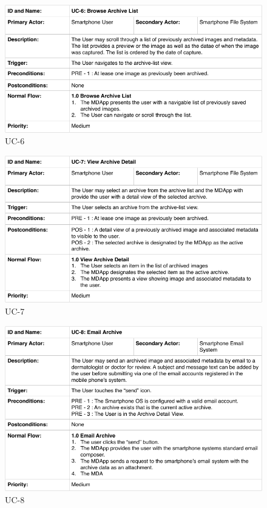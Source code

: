         \begin{figure}[H]
            \centering
            \includegraphics[width=\textwidth]{assets/requirements/uc/usecase_06.pdf}
            \caption{UC-6}
            \label{fig:uc-6}
        \end{figure}
        \begin{figure}[H]
            \centering
            \includegraphics[width=\textwidth]{assets/requirements/uc/usecase_07.pdf}
            \caption{UC-7}
            \label{fig:uc-7}
        \end{figure}
        \begin{figure}[H]
            \centering
            \includegraphics[width=\textwidth]{assets/requirements/uc/usecase_08.pdf}
            \caption{UC-8}
            \label{fig:uc-8}
        \end{figure}

